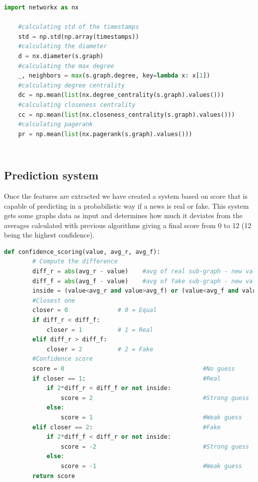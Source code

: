 \documentclass[11pt,a4paper]{article}
\begin{document}
\begin{lstlisting}[language=Python]
    import networkx as nx

    #calculating std of the timestamps
    std = np.std(np.array(timestamps))
    #calculating the diameter
    d = nx.diameter(s.graph)
    #calculating the max degree
    _, neighbors = max(s.graph.degree, key=lambda x: x[1])
    #calculating degree centrality
    dc = np.mean(list(nx.degree_centrality(s.graph).values()))
    #calculating closeness centrality
    cc = np.mean(list(nx.closeness_centrality(s.graph).values()))
    #calculating pagerank
    pr = np.mean(list(nx.pagerank(s.graph).values()))
\end{lstlisting}


\subsection*{\\Prediction system}
Once the features are extracted we have created a system based on score that is capable of predicting in a probabilistic way if a news is real or fake. This system gets some graphs data as input
and determines how much it deviates from the averages calculated with previous algorithms giving a final score from 0 to 12 (12 being the highest confidence).

\begin{lstlisting}[language=Python]
	def confidence_scoring(value, avg_r, avg_f):
        # Compute the difference
        diff_r = abs(avg_r - value)    #avg of real sub-graph - new value
        diff_f = abs(avg_f - value)    #avg of fake sub-graph - new value
        inside = (value<avg_r and value>avg_f) or (value<avg_f and value>avg_r) #The value is between the 2 avg
        #Closest one
        closer = 0              # 0 = Equal
        if diff_r < diff_f:
            closer = 1          # 1 = Real
        elif diff_r > diff_f:
            closer = 2          # 2 = Fake
        #Confidence score
        score = 0                                       #No guess
        if closer == 1:                                 #Real
            if 2*diff_r < diff_f or not inside:
                score = 2                               #Strong guess
            else:
                score = 1                               #Weak guess
        elif closer == 2:                               #Fake
            if 2*diff_f < diff_r or not inside:
                score = -2                              #Strong guess
            else:
                score = -1                              #Weak guess
        return score
\end{lstlisting}
\end{document}
